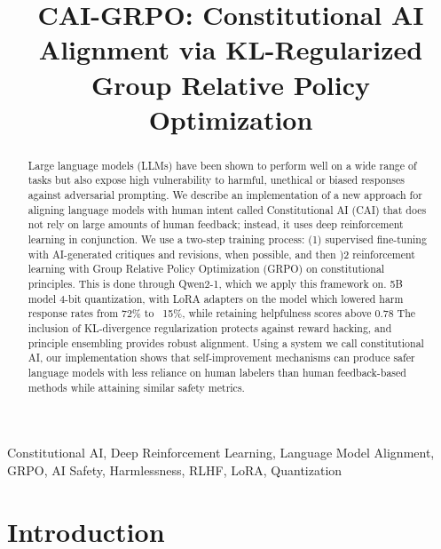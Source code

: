 \documentclass[conference]{IEEEtran}
\begin{document}
\title{CAI-GRPO: Constitutional AI Alignment via KL-Regularized Group Relative Policy Optimization}

\author{
}

\maketitle

\begin{abstract}
Large language models (LLMs) have been shown to perform well on a wide range of tasks but also expose high vulnerability to harmful, unethical or biased responses against adversarial prompting. We describe an implementation of a new approach for aligning language models with human intent called Constitutional AI (CAI) that does not rely on large amounts of human feedback; instead, it uses deep reinforcement learning in conjunction. We use a two-step training process: (1) supervised fine-tuning with AI-generated critiques and revisions, when possible, and then )2 reinforcement learning with Group Relative Policy Optimization (GRPO) on constitutional principles. This is done through Qwen2-1, which we apply this framework on. 5B model 4-bit quantization, with LoRA adapters on the model which lowered harm response rates from 72\% to ~15\%, while retaining helpfulness scores above 0.78 The inclusion of KL-divergence regularization protects against reward hacking, and principle ensembling provides robust alignment. Using a system we call constitutional AI, our implementation shows that self-improvement mechanisms can produce safer language models with less reliance on human labelers than human feedback-based methods while attaining similar safety metrics.
\end{abstract}

\begin{IEEEkeywords}
Constitutional AI, Deep Reinforcement Learning, Language Model Alignment, GRPO, AI Safety, Harmlessness, RLHF, LoRA, Quantization
\end{IEEEkeywords}


\section{Introduction}
\end{document}
